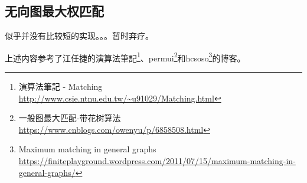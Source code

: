\subsection{无向图最大权匹配}
似乎并没有比较短的实现。。。暂时弃疗。


上述内容参考了江任捷的演算法筆記\footnote{
    演算法筆記 - Matching
    \url{http://www.csie.ntnu.edu.tw/\~u91029/Matching.html}
}、permui\footnote{
    一般图最大匹配-带花树算法
    \url{https://www.cnblogs.com/owenyu/p/6858508.html}
}和hcsoso\footnote{
    Maximum matching in general graphs
    \url{https://finiteplayground.wordpress.com/2011/07/15/maximum-matching-in-general-graphs/}
}的博客。
